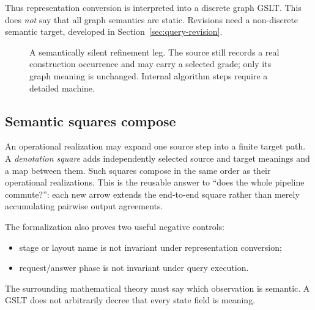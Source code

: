 \documentclass[11pt]{article}
\theoremstyle{remark}
\begin{document}
Thus representation conversion is interpreted into a discrete graph GSLT.
This does \emph{not} say that all graph semantics are static.  Revisions need a
non-discrete semantic target, developed in Section~\ref{sec:query-revision}.

\begin{figure}[htbp]
\centering
{}
\caption{A semantically silent refinement leg.  The source still records a
real construction occurrence and may carry a selected grade; only its graph
meaning is unchanged.  Internal algorithm steps require a detailed machine.}
\label{fig:discrete-realization}
\end{figure}

\subsection{Semantic squares compose}

An operational realization may expand one source step into a finite target
path.  A \emph{denotation square} adds independently selected source and target
meanings and a map between them.  Such squares compose in the same order as
their operational realizations.  This is the reusable answer to
``does the whole pipeline commute?'': each new arrow extends the end-to-end
square rather than merely accumulating pairwise output agreements.

The formalization also proves two useful negative controls:
\begin{itemize}[leftmargin=2em]
  \item stage or layout name is not invariant under representation conversion;
  \item request/answer phase is not invariant under query execution.
\end{itemize}
The surrounding mathematical theory must say which observation is semantic.
A GSLT does not arbitrarily decree that every state field is meaning.
\end{document}
